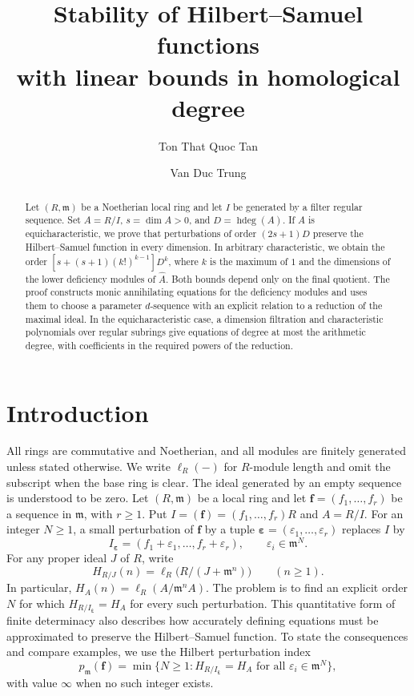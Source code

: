 \documentclass[11pt,reqno]{amsart}
\title[Stability of Hilbert--Samuel functions]{Stability of Hilbert--Samuel functions\\with linear bounds in homological degree}
\author{Ton That Quoc Tan}
\author{Van Duc Trung}
\date{}
\numberwithin{equation}{section}
\theoremstyle{definition}
\newcommand{\m}{\mathfrak m}
\newcommand{\f}{\mathbf f}
\newcommand{\hdeg}{\operatorname{hdeg}}
\begin{document}
\begin{abstract}
Let $(R,\m)$ be a Noetherian local ring and let $I$ be generated by a filter regular sequence. Set $A=R/I$, $s=\dim A>0$, and $D=\hdeg(A)$. If $A$ is equicharacteristic, we prove that perturbations of order $(2s+1)D$ preserve the Hilbert--Samuel function in every dimension. In arbitrary characteristic, we obtain the order $[s+(s+1)(k!)^{k-1}]D^k$, where $k$ is the maximum of $1$ and the dimensions of the lower deficiency modules of $\widehat A$. Both bounds depend only on the final quotient. The proof constructs monic annihilating equations for the deficiency modules and uses them to choose a parameter $d$-sequence with an explicit relation to a reduction of the maximal ideal. In the equicharacteristic case, a dimension filtration and characteristic polynomials over regular subrings give equations of degree at most the arithmetic degree, with coefficients in the required powers of the reduction.
\end{abstract}
\maketitle

\section{Introduction}

All rings are commutative and Noetherian, and all modules are finitely
generated unless stated otherwise. We write $\ell_R(-)$ for $R$-module
length and omit the subscript when the base ring is clear.
The ideal generated by an empty sequence is understood to be zero.
Let $(R,\m)$ be a local ring and let $\f=(f_1,\ldots,f_r)$ be a sequence
in $\m$, with $r\ge1$. Put $I=(\f)=(f_1,\ldots,f_r)R$ and $A=R/I$.
For an integer $N\ge1$, a small perturbation of $\f$ by a tuple
$\boldsymbol\varepsilon=(\varepsilon_1,\ldots,\varepsilon_r)$ replaces $I$ by
\[
 I_{\boldsymbol\varepsilon}=(f_1+\varepsilon_1,\ldots,f_r+\varepsilon_r),
 \qquad \varepsilon_i\in\m^N.
\]
For any proper ideal $J$ of $R$, write
\[
 H_{R/J}(n)=\ell_R\bigl(R/(J+\m^n)\bigr)\qquad(n\ge1).
\]
In particular, $H_A(n)=\ell_R(A/\m^nA)$.
The problem is to find an explicit order $N$ for which $H_{R/I_{\boldsymbol\varepsilon}}=H_A$ for every such perturbation. This quantitative form of finite determinacy also describes how accurately defining equations must be approximated to preserve the Hilbert--Samuel function.
To state the consequences and compare examples, we use the Hilbert
perturbation index
\[
 p_{\m}(\f)=\min\{N\ge1:H_{R/I_{\boldsymbol\varepsilon}}=H_A
       \text{ for all }\varepsilon_i\in\m^N\},
\]
with value $\infty$ when no such integer exists.
\end{document}

